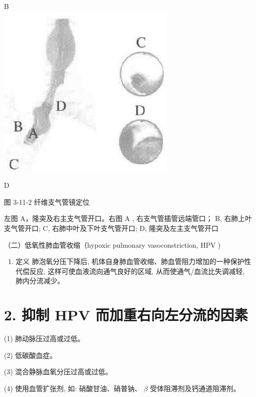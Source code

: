 \documentclass[10pt]{article}
\begin{document}
B\\
\includegraphics[max width=\textwidth, center]{2024_07_05_645bb794a4d4f32ee0c8g-221(1)}

D

图 3-11-2 纤维支气管镜定位

左图 A，隆突及右主支气管开口。右图 A , 右支气管插管远端管口； B, 右肺上叶支气管开口; C, 右肺中叶及下叶支气管开口; D, 隆突及左主支气管开口

（二）低氧性肺血管收缩（hypoxic pulmonary vasoconstriction, HPV )

\begin{enumerate}
  \item 定义 肺泡氧分压下降后, 机体自身肺血管收缩、肺血管阻力增加的一种保护性代偿反应, 这样可使血液流向通气良好的区域, 从而使通气/血流比失调减轻, 肺内分流减少。
\end{enumerate}

\section*{2. 抑制 HPV 而加重右向左分流的因素}
(1) 肺动脉压过高或过低。

(2) 低碳酸血症。

(3) 混合静脉血氧分压过高或过低。

(4) 使用血管扩张剂, 如: 硝酸甘油、硝普钠、 $\beta$ 受体阻滞剂及钙通道阻滞剂。
\end{document}
